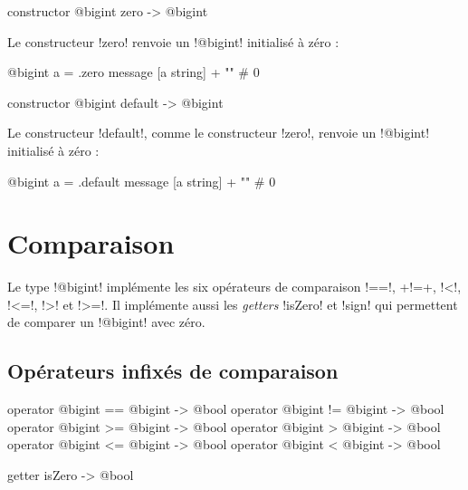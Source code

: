 
\begin{galgasbox}
constructor @bigint zero -> @bigint
\end{galgasbox}

Le constructeur \ggs!zero! renvoie un \ggs!@bigint! initialisé à zéro :
\begin{galgas}
@bigint a = .zero
message [a string] + "\n" # 0
\end{galgas}



\begin{galgasbox}
constructor @bigint default -> @bigint
\end{galgasbox}

Le constructeur \ggs!default!, comme le constructeur \ggs!zero!, renvoie un \ggs!@bigint! initialisé à zéro :
\begin{galgas}
@bigint a = .default
message [a string] + "\n" # 0
\end{galgas}











\section{Comparaison}

Le type \ggs!@bigint! implémente les six opérateurs de comparaison \ggs!==!, \ggs+!=+, \ggs!<!, \ggs!<=!, \ggs!>! et \ggs!>=!. Il implémente aussi les \emph{getters} \ggs!isZero! et \ggs!sign! qui permettent de comparer un \ggs!@bigint! avec zéro.

\subsection{Opérateurs infixés de comparaison}

\begin{galgasbox}
operator @bigint == @bigint -> @bool
operator @bigint != @bigint -> @bool
operator @bigint >= @bigint -> @bool
operator @bigint >  @bigint -> @bool
operator @bigint <= @bigint -> @bool
operator @bigint <  @bigint -> @bool
\end{galgasbox}


\begin{galgasbox}
getter isZero -> @bool
\end{galgasbox}

